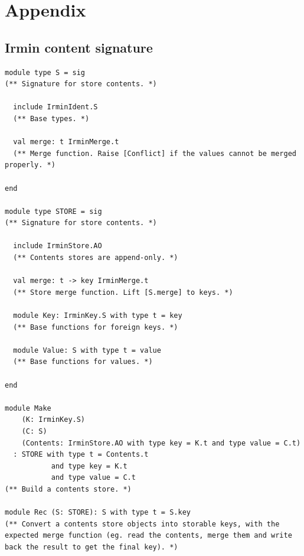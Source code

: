 \documentclass{article}
\renewcommand{\-}{\hyp}
\newcommand{\irmin}{Irmin\xspace}
\begin{document}
\nocite{*}



\newpage

\section*{Appendix}
\addtocounter{section}{1}
\setcounter{subsection}{0}
\renewcommand{\thesubsection}{\Alph{subsection}}

\subsection{\irmin content signature}
\begin{lstlisting}
module type S = sig
(** Signature for store contents. *)

  include IrminIdent.S
  (** Base types. *)

  val merge: t IrminMerge.t
  (** Merge function. Raise [Conflict] if the values cannot be merged properly. *)

end

module type STORE = sig
(** Signature for store contents. *)

  include IrminStore.AO
  (** Contents stores are append-only. *)

  val merge: t -> key IrminMerge.t
  (** Store merge function. Lift [S.merge] to keys. *)

  module Key: IrminKey.S with type t = key
  (** Base functions for foreign keys. *)

  module Value: S with type t = value
  (** Base functions for values. *)

end

module Make
    (K: IrminKey.S)
    (C: S)
    (Contents: IrminStore.AO with type key = K.t and type value = C.t)
  : STORE with type t = Contents.t
           and type key = K.t
           and type value = C.t
(** Build a contents store. *)

module Rec (S: STORE): S with type t = S.key
(** Convert a contents store objects into storable keys, with the expected merge function (eg. read the contents, merge them and write back the result to get the final key). *)
\end{lstlisting}

\newpage
\end{document}
